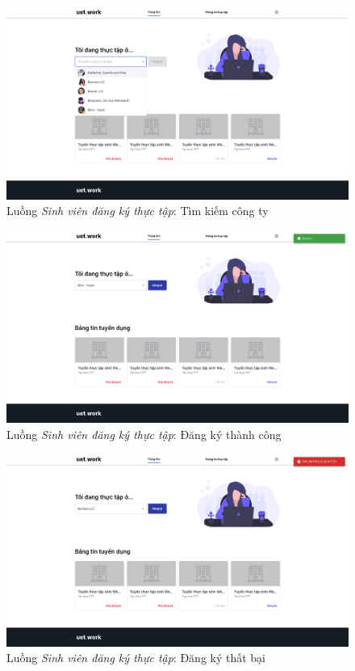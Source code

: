 \documentclass[./../main.tex]{subfiles}
\begin{document}
\begin{figure}[]
	\includegraphics[width=\linewidth]{./images/image39.png}
	\caption{Luồng \emph{Sinh viên đăng ký thực tập}: Tìm kiếm công ty}
	\label{fig:student_find_company}
\end{figure}

\begin{figure}[]
	\includegraphics[width=\linewidth]{./images/image40-1.png}
	\caption{Luồng \emph{Sinh viên đăng ký thực tập}: Đăng ký thành công}
	\label{fig:student_register_company_success}
\end{figure}

\begin{figure}[]
	\includegraphics[width=\linewidth]{./images/image40.png}
	\caption{Luồng \emph{Sinh viên đăng ký thực tập}: Đăng ký thất bại}
	\label{fig:student_register_company_failed}
\end{figure}
\end{document}
